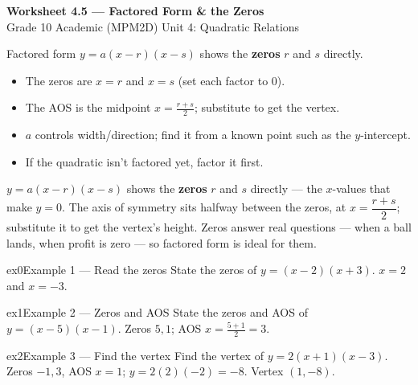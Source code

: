 \documentclass[11pt]{article}
\begin{document}
\begin{center}
{\LARGE\bfseries\color{titleblue}Worksheet 4.5 --- Factored Form \& the Zeros}\\[2pt]
{\small Grade 10 Academic (MPM2D) \textperiodcentered{} Unit 4: Quadratic Relations}
\end{center}

\begin{ideabox}
Factored form $y=a(x-r)(x-s)$ shows the \textbf{zeros} $r$ and $s$ directly.
\begin{itemize}[leftmargin=*,itemsep=2pt]
  \item The zeros are $x=r$ and $x=s$ (set each factor to $0$).
  \item The AOS is the midpoint $x=\tfrac{r+s}{2}$; substitute to get the vertex.
  \item $a$ controls width/direction; find it from a known point such as the $y$-intercept.
  \item If the quadratic isn't factored yet, factor it first.
\end{itemize}
\end{ideabox}

\begin{learnbox}
$y=a(x-r)(x-s)$ shows the \textbf{zeros} $r$ and $s$ directly — the $x$-values that make $y=0$.
The axis of symmetry sits halfway between the zeros, at $x=\dfrac{r+s}{2}$; substitute it to get the vertex's height.
Zeros answer real questions — when a ball lands, when profit is zero — so factored form is ideal for them.
\end{learnbox}


\begin{example}{ex0}{Example 1 --- Read the zeros}
State the zeros of $y=(x-2)(x+3)$.
\soln $x=2$ and $x=-3.$
\end{example}

\begin{example}{ex1}{Example 2 --- Zeros and AOS}
State the zeros and AOS of $y=(x-5)(x-1)$.
\soln Zeros $5,1$; AOS $x=\tfrac{5+1}{2}=3.$
\end{example}

\begin{example}{ex2}{Example 3 --- Find the vertex}
Find the vertex of $y=2(x+1)(x-3)$.
\soln Zeros $-1,3$, AOS $x=1$; $y=2(2)(-2)=-8$. Vertex $(1,-8)$.
\end{example}
\end{document}
